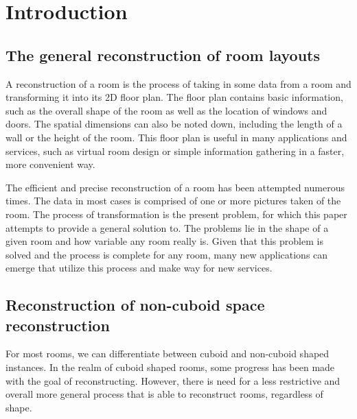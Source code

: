 \section{Introduction}

\subsection{The general reconstruction of room layouts} %
A reconstruction of a room is the process of taking in some data from a room and transforming it into its 2D floor plan. The floor plan contains basic information, such as the overall shape of the room as well as the location of windows and doors. The spatial dimensions can also be noted down, including the length of a wall or the height of the room. This floor plan is useful in many applications and services, such as virtual room design or simple information gathering in a faster, more convenient way. 

The efficient and precise reconstruction of a room has been attempted numerous
times. The data in most cases is comprised of one or more pictures taken of the room. The process of transformation is the present problem, for which this paper attempts to provide a general solution to. The problems lie in the shape of a given room and how variable any room really is. Given that this problem is solved and the process is complete for any room, many new applications can emerge that utilize this process and make way for new services.


\subsection{Reconstruction of non-cuboid space reconstruction} %
For most rooms, we can differentiate between cuboid and non-cuboid shaped instances. In the realm of cuboid shaped rooms, some progress has been made with the goal of reconstructing. However, there is need for a less restrictive and overall more general process that is able to reconstruct rooms, regardless of shape. 

